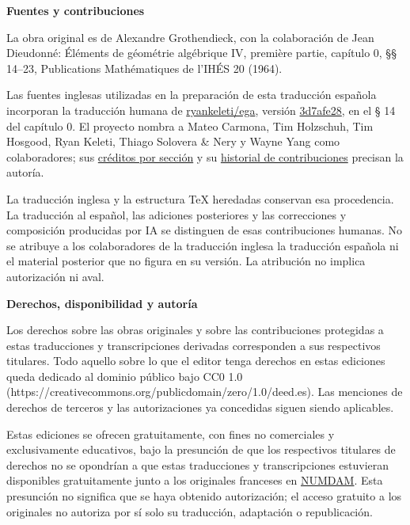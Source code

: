 \documentclass[10pt,oneside]{book}
\begin{document}
\begingroup
\small

\noindent\textbf{Fuentes y contribuciones}

La obra original es de Alexandre Grothendieck, con la colaboración de Jean Dieudonné: Éléments de géométrie algébrique IV, première partie, capítulo 0, §§ 14–23, Publications Mathématiques de l’IHÉS 20 (1964).

Las fuentes inglesas utilizadas en la preparación de esta traducción española incorporan la traducción humana de \href{https://github.com/ryankeleti/ega}{ryankeleti/ega}, versión \href{https://github.com/ryankeleti/ega/tree/3d7afe28c99d1887ccdb85acf2ca1afd93fb1971}{3d7afe28}, en el § 14 del capítulo 0. El proyecto nombra a Mateo Carmona, Tim Holzschuh, Tim Hosgood, Ryan Keleti, Thiago Solovera \& Nery y Wayne Yang como colaboradores; sus \href{https://github.com/ryankeleti/ega/blob/3d7afe28c99d1887ccdb85acf2ca1afd93fb1971/README.md}{créditos por sección} y su \href{https://github.com/ryankeleti/ega/commits/3d7afe28c99d1887ccdb85acf2ca1afd93fb1971}{historial de contribuciones} precisan la autoría.

La traducción inglesa y la estructura TeX heredadas conservan esa procedencia. La traducción al español, las adiciones posteriores y las correcciones y composición producidas por IA se distinguen de esas contribuciones humanas. No se atribuye a los colaboradores de la traducción inglesa la traducción española ni el material posterior que no figura en su versión. La atribución no implica autorización ni aval.

\par\medskip
\noindent\textbf{Derechos, disponibilidad y autoría}

Los derechos sobre las obras originales y sobre las contribuciones protegidas a estas traducciones y transcripciones derivadas corresponden a sus respectivos titulares. Todo aquello sobre lo que el editor tenga derechos en estas ediciones queda dedicado al dominio público bajo CC0 1.0 (https://creativecommons.org/publicdomain/zero/1.0/deed.es). Las menciones de derechos de terceros y las autorizaciones ya concedidas siguen siendo aplicables.

Estas ediciones se ofrecen gratuitamente, con fines no comerciales y exclusivamente educativos, bajo la presunción de que los respectivos titulares de derechos no se opondrían a que estas traducciones y transcripciones estuvieran disponibles gratuitamente junto a los originales franceses en \href{https://www.numdam.org/}{NUMDAM}. Esta presunción no significa que se haya obtenido autorización; el acceso gratuito a los originales no autoriza por sí solo su traducción, adaptación o republicación.
\end{document}
